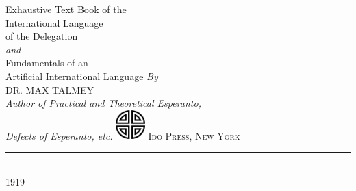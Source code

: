 \begin{titlepage}
    \begin{center}
        \fontsize{50}{50}\selectfont \textbf{}
        \vfill
        \Huge Exhaustive Text Book of the \\ International Language \\ of the Delegation \\
        \vspace{0.25cm}
        \normalsize \emph{and} \\ 
        \vspace{0.1cm}
        \Large Fundamentals of an \\ Artificial International Language
        \vfill
        \emph{By} \\
        \vspace{0.25cm}
        DR. MAX TALMEY \\ 
        \vspace{0.25cm}
        \emph{Author of Practical and Theoretical Esperanto, \\ Defects of Esperanto, etc.}
        \vfill
        \includegraphics[height = 1.125cm, width = 1.125cm]{symbol.png}
        \vfill
        \textsc{Ido Press, New York} \\
        \rule{0.2\textwidth}{.4pt} \\
        1919
    \end{center}
\end{titlepage}